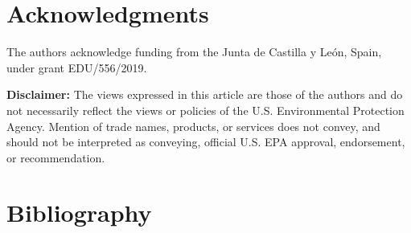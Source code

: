 \begin{refsection}[referencesCh6]
%



%

\section*{Acknowledgments} \label{section:Acknowledgments}
The authors acknowledge funding from the Junta de Castilla y Le\'{o}n, Spain, under grant
EDU/556/2019.

\textbf{Disclaimer:} The views expressed in this article are those of the authors and do not necessarily reflect the views or policies of the U.S. Environmental Protection Agency. Mention of trade names, products, or services does not convey, and should not be interpreted as conveying, official U.S. EPA approval, endorsement, or recommendation. 

\section*{Bibliography}

\printbibliography[heading=none]
\end{refsection}